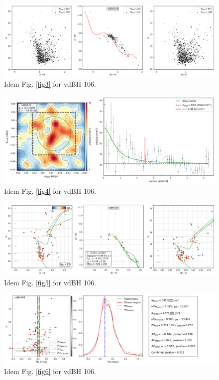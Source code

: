 \documentclass[draft]{aa}
\begin{document}
\begin{figure}[ht]
    \centering
    \includegraphics[width=\hsize]{../figs/obs_vdBH106.png}
    \caption{Idem Fig. \ref{fig3} for vdBH 106.}
    \label{fig43}
\end{figure}
\begin{figure}[ht]
    \centering
    \includegraphics[width=\hsize]{../figs/dmap_vdbh106.png}
    \caption{Idem Fig. \ref{fig4} for vdBH 106.}
    \label{fig44}
\end{figure}
\begin{figure}[ht]
    \centering
    \includegraphics[width=\hsize]{../figs/cmds_vdbh106.png}
    \caption{Idem Fig. \ref{fig5} for vdBH 106.}
    \label{fig45}
\end{figure}
\begin{figure}[ht]
    \centering
    \includegraphics[width=\hsize]{../figs/plx_vdBH106.png}
    \caption{Idem Fig. \ref{fig6} for vdBH 106.}
    \label{fig46}
\end{figure}
\end{document}
